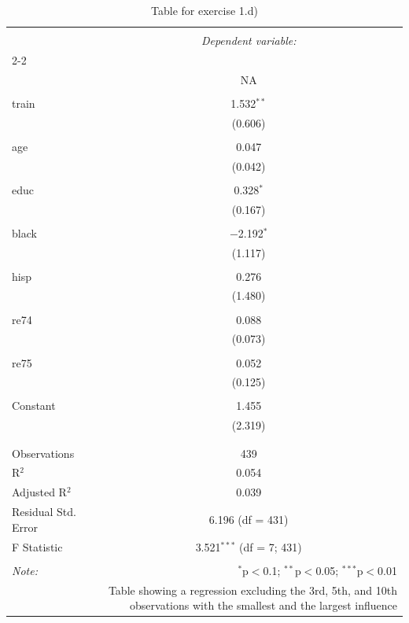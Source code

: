 
\begin{table}[!htbp] \centering 
  \caption{Table for exercise 1.d)} 
  \label{} 
\begin{tabular}{@{\extracolsep{5pt}}lc} 
\\[-1.8ex]\hline 
\hline \\[-1.8ex] 
 & \multicolumn{1}{c}{\textit{Dependent variable:}} \\ 
\cline{2-2} 
\\[-1.8ex] & NA \\ 
\hline \\[-1.8ex] 
 train & 1.532$^{**}$ \\ 
  & (0.606) \\ 
  & \\ 
 age & 0.047 \\ 
  & (0.042) \\ 
  & \\ 
 educ & 0.328$^{*}$ \\ 
  & (0.167) \\ 
  & \\ 
 black & $-$2.192$^{*}$ \\ 
  & (1.117) \\ 
  & \\ 
 hisp & 0.276 \\ 
  & (1.480) \\ 
  & \\ 
 re74 & 0.088 \\ 
  & (0.073) \\ 
  & \\ 
 re75 & 0.052 \\ 
  & (0.125) \\ 
  & \\ 
 Constant & 1.455 \\ 
  & (2.319) \\ 
  & \\ 
\hline \\[-1.8ex] 
Observations & 439 \\ 
R$^{2}$ & 0.054 \\ 
Adjusted R$^{2}$ & 0.039 \\ 
Residual Std. Error & 6.196 (df = 431) \\ 
F Statistic & 3.521$^{***}$ (df = 7; 431) \\ 
\hline 
\hline \\[-1.8ex] 
\textit{Note:}  & \multicolumn{1}{r}{$^{*}$p$<$0.1; $^{**}$p$<$0.05; $^{***}$p$<$0.01} \\ 
 & \multicolumn{1}{r}{Table showing a regression excluding the 3rd, 5th, and 10th observations with the smallest and the largest influence} \\ 
\end{tabular} 
\end{table} 
